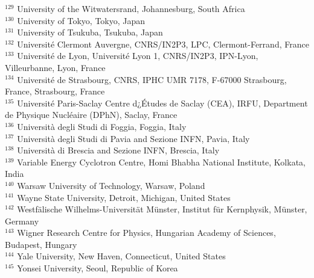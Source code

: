 \begin{flushleft}
$^{129}$ University of the Witwatersrand, Johannesburg, South Africa\\
$^{130}$ University of Tokyo, Tokyo, Japan\\
$^{131}$ University of Tsukuba, Tsukuba, Japan\\
$^{132}$ Universit\'{e} Clermont Auvergne, CNRS/IN2P3, LPC, Clermont-Ferrand, France\\
$^{133}$ Universit\'{e} de Lyon, Universit\'{e} Lyon 1, CNRS/IN2P3, IPN-Lyon, Villeurbanne, Lyon, France\\
$^{134}$ Universit\'{e} de Strasbourg, CNRS, IPHC UMR 7178, F-67000 Strasbourg, France, Strasbourg, France\\
$^{135}$  Universit\'{e} Paris-Saclay Centre d¿\'Etudes de Saclay (CEA), IRFU, Department de Physique Nucl\'{e}aire (DPhN), Saclay, France\\
$^{136}$ Universit\`{a} degli Studi di Foggia, Foggia, Italy\\
$^{137}$ Universit\`{a} degli Studi di Pavia and Sezione INFN, Pavia, Italy\\
$^{138}$ Universit\`{a} di Brescia and Sezione INFN, Brescia, Italy\\
$^{139}$ Variable Energy Cyclotron Centre, Homi Bhabha National Institute, Kolkata, India\\
$^{140}$ Warsaw University of Technology, Warsaw, Poland\\
$^{141}$ Wayne State University, Detroit, Michigan, United States\\
$^{142}$ Westf\"{a}lische Wilhelms-Universit\"{a}t M\"{u}nster, Institut f\"{u}r Kernphysik, M\"{u}nster, Germany\\
$^{143}$ Wigner Research Centre for Physics, Hungarian Academy of Sciences, Budapest, Hungary\\
$^{144}$ Yale University, New Haven, Connecticut, United States\\
$^{145}$ Yonsei University, Seoul, Republic of Korea\\


\bigskip 

\end{flushleft} 
